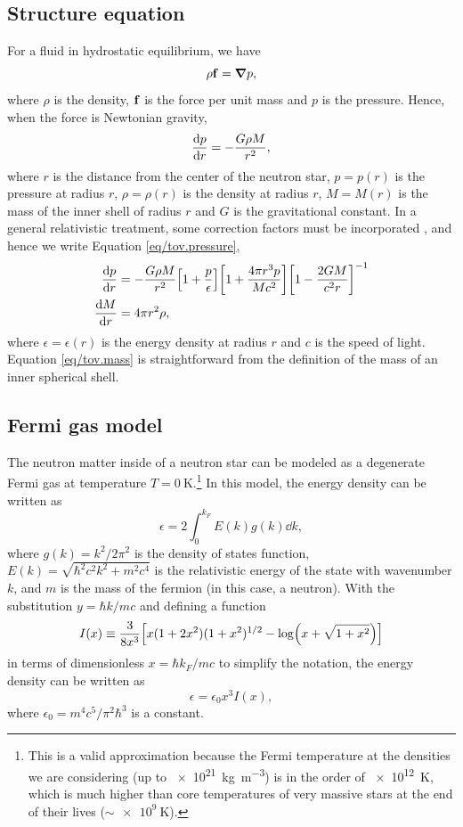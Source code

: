\documentclass[draft,11pt]{article}
\theoremstyle{definition}
\theoremstyle{remark}
\renewcommand{\vec}[1]{\vb{#1}}
\begin{document}
        \subsection{Structure equation}
            For a fluid in hydrostatic equilibrium, we have \[\rho\vec{f}=\grad{p},\] where $\rho$ is the density, $\vec{f}$ is the force per unit mass and $p$ is the pressure. Hence, when the force is Newtonian gravity, \[\dv{p}{r}=-\frac{G\rho M}{r^{2}},\] where $r$ is the distance from the center of the neutron star, $p=p(r)$ is the pressure at radius $r$, $\rho=\rho(r)$ is the density at radius $r$, $M=M(r)$ is the mass of the inner shell of radius $r$ and $G$ is the gravitational constant. In a general relativistic treatment, some correction factors must be incorporated \parencite{silbar.reddy.2004/neutron.stars}, and hence we write Equation \ref{eq/tov.pressure},
            \begin{align}
                \label{eq/tov.pressure}\dv{p}{r}&=-\frac{G\rho M}{r^{2}}\qty[1+\frac{p}{\epsilon}]\qty[1+\frac{4\pi r^{3}p}{Mc^{2}}]\qty[1-\frac{2GM}{c^{2}r}]^{-1}\\
                \label{eq/tov.mass}\dv{M}{r}&=4\pi r^{2}\rho,
            \end{align}
            where $\epsilon=\epsilon(r)$ is the energy density at radius $r$ and $c$ is the speed of light. Equation \ref{eq/tov.mass} is straightforward from the definition of the mass of an inner spherical shell.

            
        \subsection{Fermi gas model} %
            The neutron matter inside of a neutron star can be modeled as a degenerate Fermi gas at temperature $T=\SI{0}{\kelvin}$.\footnote{This is a valid approximation because the Fermi temperature at the densities we are considering (up to \SI{e21}{\kilogram\per\meter\cubed}) is in the order of \SI{e12}{\kelvin}, which is much higher than core temperatures of very massive stars at the end of their lives ($\sim\SI{e9}{\kelvin}$).} In this model, the energy density can be written as \parencite{koonin.1986/computational.physics/rk4.white.dwarf}
            \[\epsilon=2\int_{0}^{k_{F}}E(k)g(k)\dd{k},\] where $g(k)=k^{2}/2\pi^{2}$ is the density of states function, $E(k)=\sqrt{\hbar^{2}c^{2}k^{2}+m^{2}c^{4}}$ is the relativistic energy of the state with wavenumber $k$, and $m$ is the mass of the fermion (in this case, a neutron). With the substitution $y=\hbar k/mc$ and defining a function \parencite{koonin.1986/computational.physics/rk4.white.dwarf} \[I(x)\equiv \frac{3}{8x^{3}}\qty[x(1+2x^{2})(1+x^{2})^{1/2}-\log(x+\sqrt{1+x^{2}})]\] in terms of dimensionless $x=\hbar k_{F}/mc$ to simplify the notation, the energy density can be written as \[\epsilon=\epsilon_{0}x^{3}I(x),\] where $\epsilon_{0}=m^{4}c^{5}/\pi^{2}\hbar^{3}$ is a constant.
            
\end{document}

